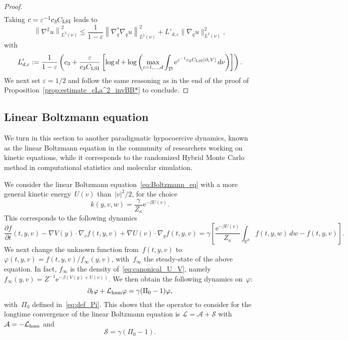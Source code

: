 \documentclass{article}
\newcommand{\rme}{\mathrm{e}}
\newcommand{\cL}{\mathcal{L}}
\newcommand{\cLs}{\mathcal{S}}
\newcommand{\cLa}{\mathcal{A}}
\newcommand{\cLham}{\mathcal{L}_{\rm ham}}
\newcommand{\cD}{\mathcal{D}}
\newcommand{\eps}{\varepsilon}
\newcommand{\R}{\mathbb{R}}
\renewcommand{\leq}{\leqslant}
\begin{document}
\begin{proof}
\begin{equation}
\begin{aligned}
    \end{aligned}
\end{equation}
Taking $c = \varepsilon^{-1}c_3 C_{\rm LSI}$ leads to 
\[
\left\|\nabla^2 u\right\|_{L^2(\nu)}^2 \leq \frac{1}{1-\varepsilon}\left\|\nabla_q^{*}\nabla_q u \right\|_{L^2(\nu)}^2 + L'_{d, \varepsilon}\|\nabla_q u\|_{L^2(\nu)}^2,
\]
with
\[
L'_{d, \varepsilon} := \frac{1}{1-\varepsilon}\left(c_3 + \frac{\varepsilon}{c_3 C_{\rm LSI}}\left[\log d + \log\left( \max_{i=1,\dots,d} \int_\cD \rme^{\varepsilon^{-1}c_3 C_{\rm LSI}|\partial_i V|} \, d\nu \right)\right]\right).
\]
We next set $\eps = 1/2$ and follow the same reasoning as in the end of the proof of Proposition~\ref{prop:estimate_cLa^2_invBB*} to conclude.
\end{proof}

\subsection{Linear Boltzmann equation}
\label{sec:PDMP}

We turn in this section to another paradigmatic hypocoercive dynamics, known as the linear Boltzmann equation in the community of researchers working on kinetic equations, while it corresponds to the randomized Hybrid Monte Carlo method in computational statistics and molecular simulation.

We consider the linear Boltzmann equation~\eqref{eq:Boltzmann_eq} with a more general kinetic energy~$U(v)$ than~$|v|^2/2$, for the choice
\[
k(y,v,w) = \frac{\gamma}{Z_\kappa} \rme^{-\beta U(v)}.
\]
This corresponds to the following dynamics 
\[
\frac{\partial f}{\partial t}(t,y,v) - \nabla V(y) \cdot \nabla_v f(t,y,v) + \nabla U(v) \cdot\nabla_y f(t,y,v) = \gamma \left[ \frac{\rme^{-\beta U(v)}}{Z_\kappa} \int_{\R^d} f(t,y,w) \, dw - f(t,y,v)\right].
\]
We next change the unknown function from~$f(t,y,v)$ to~$\varphi(t,y,v) = f(t,y,v) / f_\infty(y,v)$, with~$f_\infty$ the steady-state of the above equation. In fact, $f_\infty$ is the density of~\eqref{eq:canonical_U_V}, namely $f_\infty(y,v) = Z^{-1} \rme^{-\beta (V(y)+U(v))}$. We then obtain the following dynamics on~$\varphi$:
\[
\partial_t \varphi + \cLham \varphi = \gamma(\Pi_0-1)\varphi,
\]
with~$\Pi_0$ defined in~\eqref{eq:def_Pi}. This shows that the operator to consider for the longtime convergence of the linear Boltzmann equation is $\cL = \cLa + \cLs$ with $\cLa = -\cLham$ and
\begin{equation}
  \label{eq:LFD_PDMP}
  \cLs = \gamma(\Pi_0-1).
\end{equation}
\end{document}
